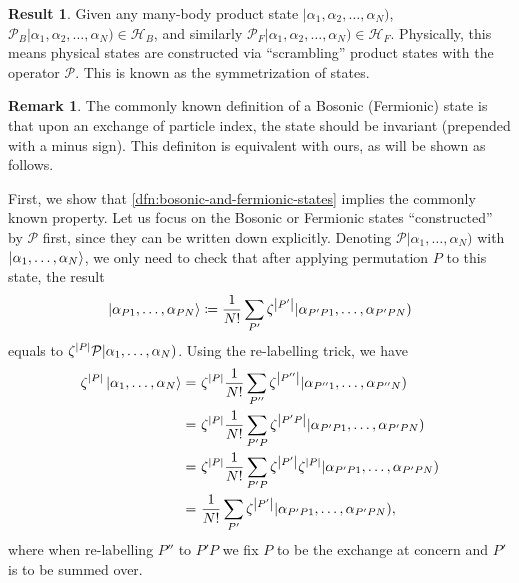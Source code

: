 \documentclass{article}
\theoremstyle{definition}
\newtheorem{res}[mot]{Result}
\newtheorem{rem}[mot]{Remark}
\numberwithin{equation}{section}
\begin{document}
\begin{graybox}
\begin{res}
    Given any many-body product state $|\alpha_1,\alpha_2, \ldots ,\alpha_{N})$, 
    $\mathcal{P}_{B}|\alpha_1,\alpha_2, \ldots ,\alpha_{N}) \in \mathcal{H}_{B}$, 
    and similarly 
    $\mathcal{P}_{F}|\alpha_1,\alpha_2, \ldots ,\alpha_{N}) \in \mathcal{H}_{F}$. 
    Physically, this means physical states are 
    constructed via ``scrambling'' product states with the 
    operator $\mathcal{P}$.
    This is known as the symmetrization of states.
\end{res}
\end{graybox}

\begin{rem}
    \label{rem:equivalence-to-commonly-known-dfn}
    The commonly known definition of a Bosonic (Fermionic) 
    state is that upon an exchange of particle index, 
    the state should be invariant (prepended with a minus sign). 
    This definiton is equivalent with ours, 
    as will be shown as follows. 

    First, we show that 
    \cref{dfn:bosonic-and-fermionic-states}
    implies the commonly known property.
    Let us focus on the Bosonic or Fermionic states ``constructed'' by $\mathcal{P}$ first,
    since they can be written down explicitly.
    Denoting $\mathcal{P} |\alpha_1, \ldots ,\alpha_{N})$ with 
    $\ket{\alpha_1, \ldots ,\alpha_{N}}$, 
    we only need to check that after applying permutation $P$
    to this state, the result
    \[
    \ket{\alpha_{P1}, \ldots ,\alpha_{PN}} 
    \coloneqq    
    \frac{1}{N!}
        \sum_{P'}
        \zeta^{\abs{P'}}
        |\alpha_{P'P1}, \ldots ,\alpha_{P'PN})
    \]
    equals to 
    $\zeta^{\abs{P}} \mathcal{P} |\alpha_1, \ldots ,\alpha_{N})$.
    Using the re-labelling trick, we have
    \begin{align*}
        \zeta^{\abs{P}}\ket{\alpha_1, \ldots ,\alpha_{N}}
        =&\ 
        \zeta^{\abs{P}}\frac{1}{N!}\sum_{P''}
        \zeta^{\abs{P''}}
        |\alpha_{P''1}, \ldots ,\alpha_{P''N}) \\
        =&\ 
        \zeta^{\abs{P}}\frac{1}{N!}\sum_{P'P}\zeta^{\abs{P'P}}
        |\alpha_{P'P1}, \ldots ,\alpha_{P'PN}) \\
        =&\ 
        \zeta^{\abs{P}}\frac{1}{N!}\sum_{P'P}
        \zeta^{\abs{P'}}\zeta^{\abs{P}}
        |\alpha_{P'P1}, \ldots ,\alpha_{P'P N}) \\
        =&\ 
        \frac{1}{N!}
        \sum_{P'}\zeta^{\abs{P'}}
        |\alpha_{P'P1}, \ldots ,\alpha_{P'P N}),
    \end{align*}
    where when re-labelling $P''$ to $P'P$ we 
    fix $P$ to be the exchange at concern and 
    $P'$ is to be summed over.


\end{rem}
\end{document}
